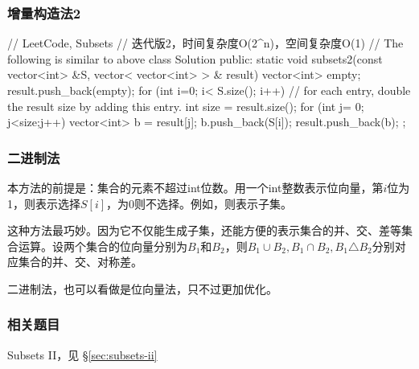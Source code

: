 \subsubsection{增量构造法2}
\begin{Code}
// LeetCode, Subsets
// 迭代版2，时间复杂度O(2^n)，空间复杂度O(1)
// The following is similar to above 
class Solution {
public:
	static void subsets2(const vector<int> &S, vector< vector<int> > & result){
	   vector<int> empty;
	   result.push_back(empty);
	   for (int i=0; i< S.size(); i++){ // for each entry, double the result size by adding this entry.
	      int size = result.size();
	      for (int j= 0; j<size;j++){
		 vector<int> b = result[j];
		 b.push_back(S[i]);
		 result.push_back(b);
	      }
	   }
	}
};
\end{Code}


\subsubsection{二进制法}
本方法的前提是：集合的元素不超过int位数。用一个int整数表示位向量，第$i$位为1，则表示选择$S[i]$，为0则不选择。例如，则表示子集。

这种方法最巧妙。因为它不仅能生成子集，还能方便的表示集合的并、交、差等集合运算。设两个集合的位向量分别为$B_1$和$B_2$，则$B_1\cup B_2, B_1 \cap B_2, B_1 \triangle B_2$分别对应集合的并、交、对称差。

二进制法，也可以看做是位向量法，只不过更加优化。



\subsubsection{相关题目}
\begindot
\item Subsets II，见 \S \ref{sec:subsets-ii}
\myenddot


